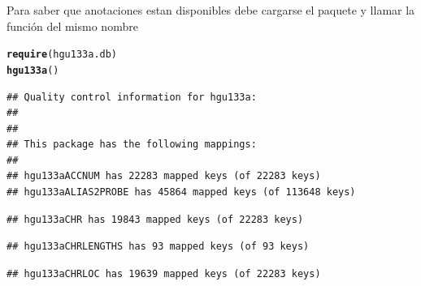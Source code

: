 \documentclass[a4paper]{article}\usepackage[]{graphicx}\usepackage[]{color}
\makeatletter
\newcommand{\hlstd}[1]{\textcolor[rgb]{0.345,0.345,0.345}{#1}}%
\newcommand{\hlkwd}[1]{\textcolor[rgb]{0.737,0.353,0.396}{\textbf{#1}}}%
\newenvironment{kframe}{%
 \def\at@end@of@kframe{}%
 \ifinner\ifhmode%
  \def\at@end@of@kframe{\end{minipage}}%
  \begin{minipage}{\columnwidth}%
 \fi\fi%
 \def\FrameCommand##1{\hskip\@totalleftmargin \hskip-\fboxsep
 \colorbox{shadecolor}{##1}\hskip-\fboxsep
     \hskip-\linewidth \hskip-\@totalleftmargin \hskip\columnwidth}%
 \MakeFramed {\advance\hsize-\width
   \@totalleftmargin\z@ \linewidth\hsize
   \@setminipage}}%
 {\par\unskip\endMakeFramed%
 \at@end@of@kframe}
\newenvironment{knitrout}{}{} %
\makeatother
\begin{document}
Para saber que anotaciones estan disponibles debe cargarse el paquete y llamar la función del mismo nombre 

\begin{knitrout}
\color{fgcolor}\begin{kframe}
\begin{alltt}
\hlkwd{require}\hlstd{(hgu133a.db)}
\hlkwd{hgu133a}\hlstd{()}
\end{alltt}
\begin{verbatim}
## Quality control information for hgu133a:
## 
## 
## This package has the following mappings:
## 
## hgu133aACCNUM has 22283 mapped keys (of 22283 keys)
## hgu133aALIAS2PROBE has 45864 mapped keys (of 113648 keys)
\end{verbatim}


{\ttfamily\noindent\color{warningcolor}{\#\# Warning in (function () : hgu133aCHR is deprecated. Please use an appropriate TxDb object or\\\#\#\ \  package for this kind of data.}}\begin{verbatim}
## hgu133aCHR has 19843 mapped keys (of 22283 keys)
\end{verbatim}


{\ttfamily\noindent\color{warningcolor}{\#\# Warning in (function () : hgu133aCHRLENGTHS is deprecated. Please use an appropriate TxDb\\\#\#\ \  object or package for this kind of data.}}\begin{verbatim}
## hgu133aCHRLENGTHS has 93 mapped keys (of 93 keys)
\end{verbatim}


{\ttfamily\noindent\color{warningcolor}{\#\# Warning in (function () : hgu133aCHRLOC is deprecated. Please use an appropriate TxDb object\\\#\#\ \  or package for this kind of data.}}\begin{verbatim}
## hgu133aCHRLOC has 19639 mapped keys (of 22283 keys)
\end{verbatim}



\end{kframe}
\end{knitrout}
\end{document}
